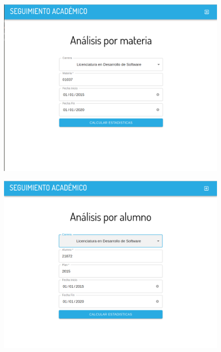 \begin{figure}[!htbp]
  \centering
    \includegraphics[scale=0.3]{images/seguimiento-academico/sa-form-materia.png}
  \label{fig:sa-materia}
\end{figure}

\begin{figure}[!htbp]
  \centering
    \includegraphics[scale=0.3]{images/seguimiento-academico/sa-form-alumno.png}
  \label{fig:sa-alumno}
\end{figure}


